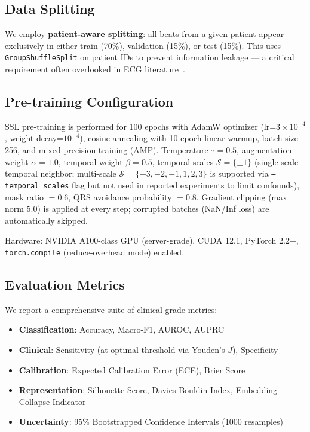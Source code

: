 \documentclass[journal,10pt]{IEEEtran}
\begin{document}
\subsection{Data Splitting}

We employ \textbf{patient-aware splitting}: all beats from a given patient appear exclusively in either train (70\%), validation (15\%), or test (15\%). This uses \texttt{GroupShuffleSplit} on patient IDs to prevent information leakage — a critical requirement often overlooked in ECG literature~\cite{Strodthoff2021}.

\subsection{Pre-training Configuration}

SSL pre-training is performed for 100 epochs with AdamW optimizer (lr=$3 \times 10^{-4}$, weight decay=$10^{-4}$), cosine annealing with 10-epoch linear warmup, batch size 256, and mixed-precision training (AMP). Temperature $\tau = 0.5$, augmentation weight $\alpha = 1.0$, temporal weight $\beta = 0.5$, temporal scales $\mathcal{S} = \{\pm 1\}$ (single-scale temporal neighbor; multi-scale $\mathcal{S} = \{-3,-2,-1,1,2,3\}$ is supported via \texttt{--temporal\_scales} flag but not used in reported experiments to limit confounds), mask ratio $= 0.6$, QRS avoidance probability $= 0.8$. Gradient clipping (max norm 5.0) is applied at every step; corrupted batches (NaN/Inf loss) are automatically skipped.

Hardware: NVIDIA A100-class GPU (server-grade), CUDA 12.1, PyTorch 2.2+, \texttt{torch.compile} (reduce-overhead mode) enabled.

\subsection{Evaluation Metrics}

We report a comprehensive suite of clinical-grade metrics:
\begin{itemize}
    \item \textbf{Classification}: Accuracy, Macro-F1, AUROC, AUPRC
    \item \textbf{Clinical}: Sensitivity (at optimal threshold via Youden's $J$), Specificity
    \item \textbf{Calibration}: Expected Calibration Error (ECE), Brier Score
    \item \textbf{Representation}: Silhouette Score, Davies-Bouldin Index, Embedding Collapse Indicator
    \item \textbf{Uncertainty}: 95\% Bootstrapped Confidence Intervals (1000 resamples)
\end{itemize}
\end{document}
